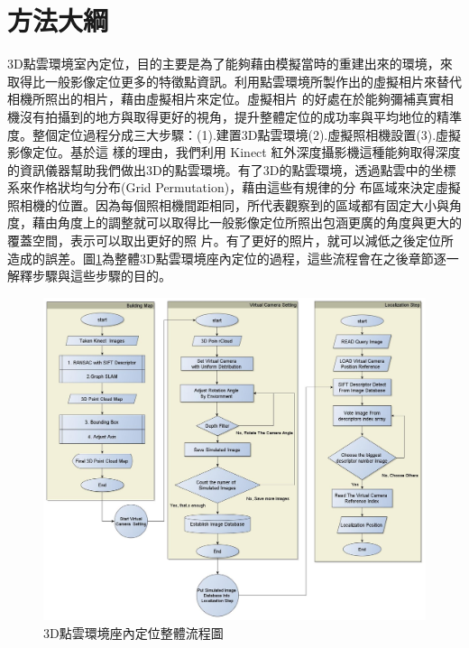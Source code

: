 
%
\section{方法大綱}
  3D點雲環境室內定位，目的主要是為了能夠藉由模擬當時的重建出來的環境，來取得比一般影像定位更多的特徵點資訊。利用點雲環境所製作出的虛擬相片來替代相機所照出的相片，藉由虛擬相片來定位。虛擬相片
  的好處在於能夠彌補真實相機沒有拍攝到的地方與取得更好的視角，提升整體定位的成功率與平均地位的精準度。整個定位過程分成三大步驟：(1).建置3D點雲環境(2).虛擬照相機設置(3).虛擬影像定位。基於這
  樣的理由，我們利用 Kinect 紅外深度攝影機這種能夠取得深度的資訊儀器幫助我們做出3D的點雲環境。有了3D的點雲環境，透過點雲中的坐標系來作格狀均勻分布(Grid Permutation)，藉由這些有規律的分
  布區域來決定虛擬照相機的位置。因為每個照相機間距相同，所代表觀察到的區域都有固定大小與角度，藉由角度上的調整就可以取得比一般影像定位所照出包涵更廣的角度與更大的覆蓋空間，表示可以取出更好的照
  片。有了更好的照片，就可以減低之後定位所造成的誤差。圖\ref{fig:Enire System Process}為整體3D點雲環境座內定位的過程，這些流程會在之後章節逐一解釋步驟與這些步驟的目的。
  
\begin{figure}
\begin{center}

  \includegraphics[width=1.1\textwidth]{figures/Enire_System_Process.jpg}
  \caption{3D點雲環境座內定位整體流程圖}
  \label{fig:Enire System Process}
  
\end{center}
\end{figure}
  
